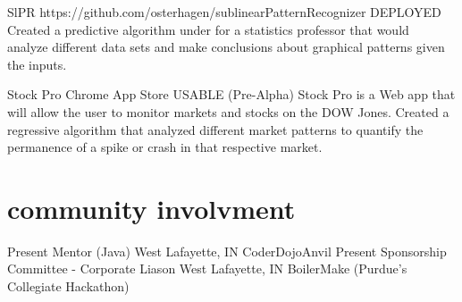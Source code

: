 \documentclass[]{friggeri-cv} %
\begin{document}
\begin{entrylist}


\entry
{SlPR}
{https://github.com/osterhagen/sublinearPatternRecognizer}
{DEPLOYED}
{Created a predictive algorithm under for a statistics professor that would \\ analyze different data sets and make conclusions about graphical patterns given the inputs.}


\entry
{Stock Pro}
{Chrome App Store}
{USABLE (Pre-Alpha)}
{Stock Pro is a Web app that will allow the user to monitor markets and stocks on the DOW Jones. Created a regressive algorithm that analyzed different market patterns to quantify the permanence of a spike or crash in that respective market.}


\end{entrylist}
\vspace{-7.5pt}
\section{community involvment}
\vspace{-5pt}
\begin{entrylist}
\entry
{Present}
{Mentor (Java)}
{West Lafayette, IN}
{CoderDojoAnvil}
\entry
{Present}
{Sponsorship Committee - Corporate Liason}
{West Lafayette, IN}
{BoilerMake (Purdue's Collegiate Hackathon)}
\end{entrylist}
\end{document}

